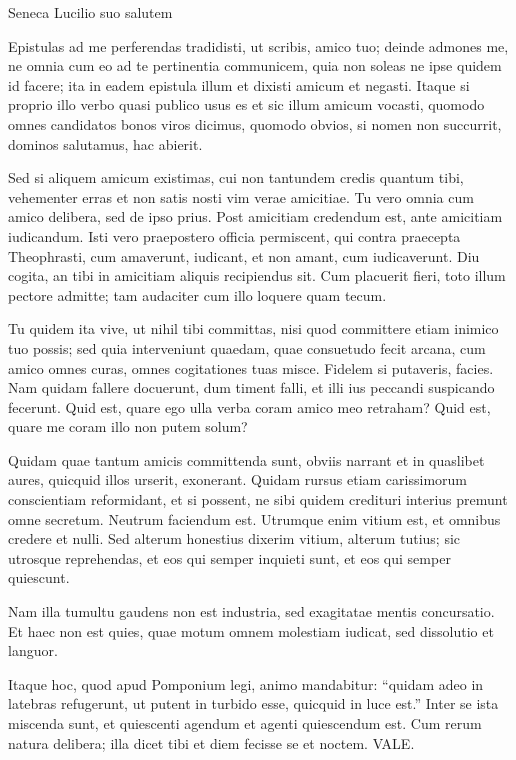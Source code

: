 {\large
\noindent Seneca Lucilio suo salutem

\medskip


\noindent Epistulas ad me perferendas tradidisti, ut scribis, amico tuo; deinde admones me, ne omnia cum eo ad te pertinentia communicem, quia non soleas ne ipse quidem id facere; ita in eadem epistula illum et dixisti amicum et negasti. Itaque si proprio illo verbo quasi publico usus es et sic illum amicum vocasti, quomodo omnes candidatos bonos viros dicimus, quomodo obvios, si nomen non succurrit, dominos salutamus, hac abierit.

Sed si aliquem amicum existimas, cui non tantundem credis quantum tibi, vehementer erras et non satis nosti vim verae amicitiae. Tu vero omnia cum amico delibera, sed de ipso prius. Post amicitiam credendum est, ante amicitiam iudicandum. Isti vero praepostero officia permiscent, qui contra praecepta Theophrasti, cum amaverunt, iudicant, et non amant, cum iudicaverunt. Diu cogita, an tibi in amicitiam aliquis recipiendus sit. Cum placuerit fieri, toto illum pectore admitte; tam audaciter cum illo loquere quam tecum.

Tu quidem ita vive, ut nihil tibi committas, nisi quod committere etiam inimico tuo possis; sed quia interveniunt quaedam, quae consuetudo fecit arcana, cum amico omnes curas, omnes cogitationes tuas misce. Fidelem si putaveris, facies. Nam quidam fallere docuerunt, dum timent falli, et illi ius peccandi suspicando fecerunt. Quid est, quare ego ulla verba coram amico meo retraham? Quid est, quare me coram illo non putem solum?

Quidam quae tantum amicis committenda sunt, obviis narrant et in quaslibet aures, quicquid illos urserit, exonerant. Quidam rursus etiam carissimorum conscientiam reformidant, et si possent, ne sibi quidem credituri interius premunt omne secretum. Neutrum faciendum est. Utrumque enim vitium est, et omnibus credere et nulli. Sed alterum honestius dixerim vitium, alterum tutius; sic utrosque reprehendas, et eos qui semper inquieti sunt, et eos qui semper quiescunt.

Nam illa tumultu gaudens non est industria, sed exagitatae mentis concursatio. Et haec non est quies, quae motum omnem molestiam iudicat, sed dissolutio et languor.

Itaque hoc, quod apud Pomponium legi, animo mandabitur: ``quidam adeo in latebras refugerunt, ut putent in turbido esse, quicquid in luce est.'' Inter se ista miscenda sunt, et quiescenti agendum et agenti quiescendum est. Cum rerum natura delibera; illa dicet tibi et diem fecisse se et noctem. VALE.

}




